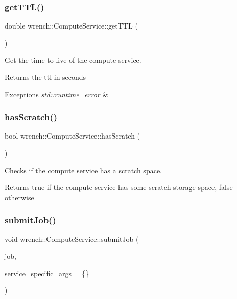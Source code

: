 \subsubsection{\texorpdfstring{get\+T\+T\+L()}{getTTL()}}
{\footnotesize\ttfamily double wrench\+::\+Compute\+Service\+::get\+T\+TL (\begin{DoxyParamCaption}{ }\end{DoxyParamCaption})}



Get the time-\/to-\/live of the compute service. 

\begin{DoxyReturn}{Returns}
the ttl in seconds
\end{DoxyReturn}

\begin{DoxyExceptions}{Exceptions}
{\em std\+::runtime\+\_\+error} & \\
\hline
\end{DoxyExceptions}
\mbox{\label{classwrench_1_1_compute_service_a07b64249656b26fef280c1f9db823acf}} 
\subsubsection{\texorpdfstring{has\+Scratch()}{hasScratch()}}
{\footnotesize\ttfamily bool wrench\+::\+Compute\+Service\+::has\+Scratch (\begin{DoxyParamCaption}{ }\end{DoxyParamCaption})}



Checks if the compute service has a scratch space. 

\begin{DoxyReturn}{Returns}
true if the compute service has some scratch storage space, false otherwise 
\end{DoxyReturn}
\mbox{\label{classwrench_1_1_compute_service_abc9e51234c29965341727f07b446ff0c}} 
\subsubsection{\texorpdfstring{submit\+Job()}{submitJob()}}
{\footnotesize\ttfamily void wrench\+::\+Compute\+Service\+::submit\+Job (\begin{DoxyParamCaption}\item[{\hyperlink{classwrench_1_1_workflow_job}{Workflow\+Job} $\ast$}]{job,  }\item[{std\+::map$<$ std\+::string, std\+::string $>$}]{service\+\_\+specific\+\_\+args = {\ttfamily \{\}} }\end{DoxyParamCaption})}



